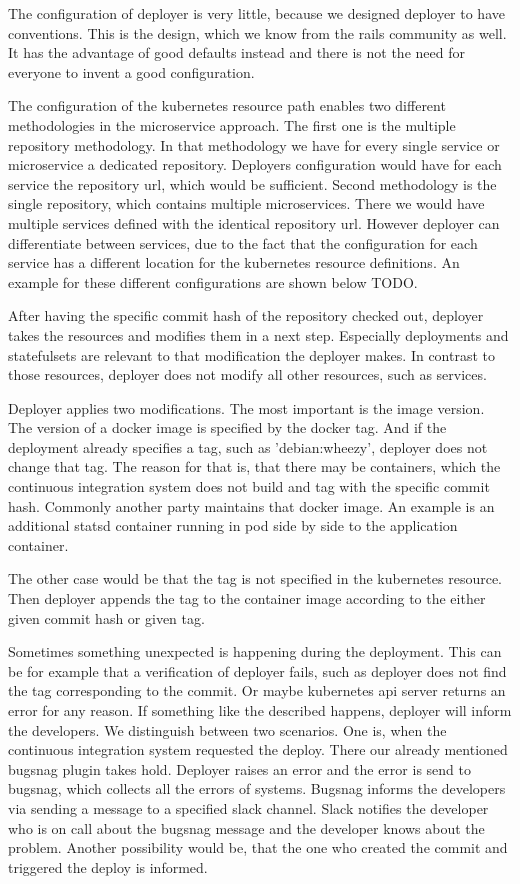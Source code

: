 The configuration of deployer is very little, because we designed deployer to have
conventions. This is the design, which we know from the rails community as well. It has
the advantage of good defaults instead and there is not the need for everyone to invent a
good configuration.

The configuration of the kubernetes resource path enables two different methodologies in
the microservice approach. The first one is the multiple repository methodology. In that
methodology we have for every single service or microservice a dedicated repository.
Deployers configuration would have for each service the repository url, which would be
sufficient. Second methodology is the single repository, which contains multiple
microservices. There we would have multiple services defined with the identical repository
url. However deployer can differentiate between services, due to the fact that the
configuration for each service has a different location for the kubernetes resource
definitions. An example for these different configurations are shown below TODO.

After having the specific commit hash of the repository checked out, deployer takes the
resources and modifies them in a next step. Especially deployments and statefulsets are
relevant to that modification the deployer makes. In contrast to those resources, deployer
does not modify all other resources, such as services.

Deployer applies two modifications. The most important is the image version. The version
of a docker image is specified by the docker tag. And if the deployment already specifies
a tag, such as 'debian:wheezy', deployer does not change that tag. The reason for that is,
that there may be containers, which the continuous integration system does not build and
tag with the specific commit hash. Commonly another party maintains that docker image. An
example is an additional statsd container running in pod side by side to the application
container.

The other case would be that the tag is not specified in the kubernetes resource. Then
deployer appends the tag to the container image according to the either given commit hash
or given tag.

Sometimes something unexpected is happening during the deployment. This can be for example
that a verification of deployer fails, such as deployer does not find the tag
corresponding to the commit. Or maybe kubernetes api server returns an error for any
reason. If something like the described happens, deployer will inform the developers. We
distinguish between two scenarios. One is, when the continuous integration system
requested the deploy. There our already mentioned bugsnag plugin takes hold. Deployer
raises an error and the error is send to bugsnag, which collects all the errors of
systems. Bugsnag informs the developers via sending a message to a specified slack
channel. Slack notifies the developer who is on call about the bugsnag message and the
developer knows about the problem. Another possibility would be, that the one who created
the commit and triggered the deploy is informed.

